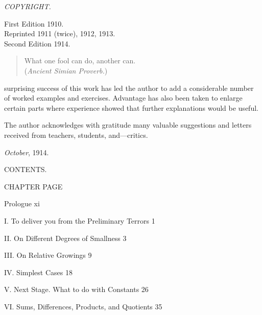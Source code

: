     
    \newpage
    \null\vfill
    \thispagestyle{empty}
    \begin{center}
    \footnotesize
    \textit{COPYRIGHT.}
    \bigskip
    
    First Edition 1910.\\
    Reprinted 1911 (twice), 1912, 1913.\\
    Second Edition 1914.
    \end{center}
    \vfill
    
    
    \cleardoublepage
    \thispagestyle{empty}
    \null\vfill
    \begin{quote}
    What one fool can do, another can. \\
    \raggedleft(\textit{Ancient Simian Proverb.})
    \end{quote}
    \vfill
    
    
    
     surprising success of this work has led the
    author to add a considerable number of worked
    examples and exercises. Advantage has also been
    taken to enlarge certain parts where experience
    showed that further explanations would be useful.
    
    The author acknowledges with gratitude many
    valuable suggestions and letters received from teachers,
    students, and---critics.
    
    \medskip
    \emph{October}, 1914.
    
    \cleardoublepage
    \tableofcontents
    \iffalse %
    
    CONTENTS.
    
    CHAPTER        PAGE
    
    Prologue  xi
    
    I. To deliver you from the Preliminary Terrors   1
    
    II. On Different Degrees of Smallness  3
    
    III. On Relative Growings   9
    
    IV. Simplest Cases 18
    
    V. Next Stage. What to do with Constants  26
    
    VI. Sums, Differences, Products, and Quotients  35
    
